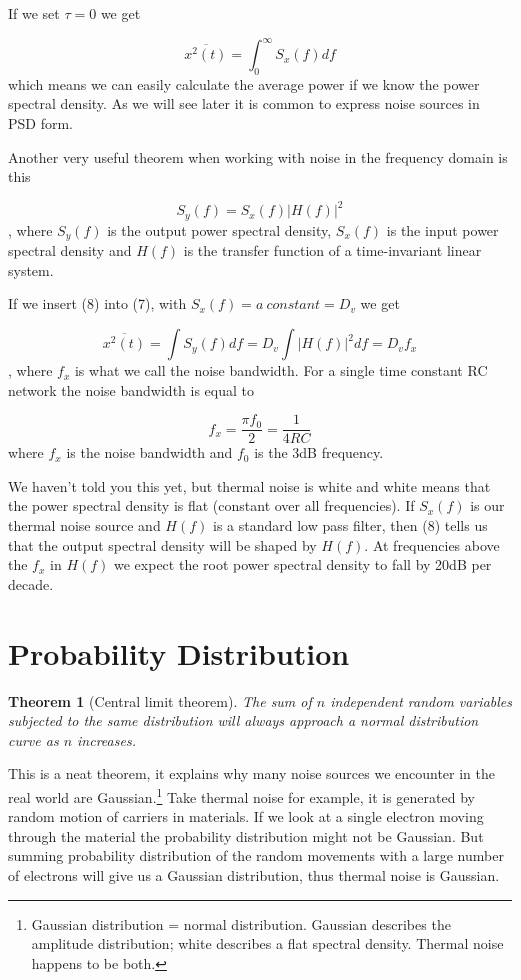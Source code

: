 If we set \(\tau=0\) we get

\[\overline{x^2(t)} = \int_{0}^{\infty}{S_x(f)df} \tag{7}\] which means
we can easily calculate the average power if we know the power spectral
density. As we will see later it is common to express noise sources in
PSD form.

Another very useful theorem when working with noise in the frequency
domain is this

\[S_y(f) = S_x(f)\vert H(f)\vert ^2 \tag{8}\] , where \(S_y(f)\) is the
output power spectral density, \(S_x(f)\) is the input power spectral
density and \(H(f)\) is the transfer function of a time-invariant linear
system.

If we insert (8) into (7), with \(S_x(f) = a\:constant = D_v\) we get

\[\overline{x^2(t)} = \int{S_y(f)df} = D_v\int{\vert H(f)\vert ^2 df} = D_v f_x\]
, where \(f_x\) is what we call the noise bandwidth. For a single time
constant RC network the noise bandwidth is equal to

\[f_x = \frac{\pi f_0}{2} = \frac{1}{4 R C}\] where \(f_x\) is the noise
bandwidth and \(f_0\) is the 3dB frequency.

We haven't told you this yet, but thermal noise is white and white means
that the power spectral density is flat (constant over all frequencies).
If \(S_x(f)\) is our thermal noise source and \(H(f)\) is a standard low
pass filter, then (8) tells us that the output spectral density will be
shaped by \(H(f)\). At frequencies above the \(f_x\) in \(H(f)\) we
expect the root power spectral density to fall by 20dB per decade.

\section{Probability Distribution}\label{probability-distribution}

\textbf{Theorem 1} (Central limit theorem). \emph{The sum of \(n\)
independent random variables subjected to the same distribution will
always approach a normal distribution curve as \(n\) increases.}

This is a neat theorem, it explains why many noise sources we encounter
in the real world are Gaussian.\footnote{Gaussian distribution = normal
  distribution. Gaussian describes the amplitude distribution; white
  describes a flat spectral density. Thermal noise happens to be both.}
Take thermal noise for example, it is generated by random motion of
carriers in materials. If we look at a single electron moving through
the material the probability distribution might not be Gaussian. But
summing probability distribution of the random movements with a large
number of electrons will give us a Gaussian distribution, thus thermal
noise is Gaussian.

